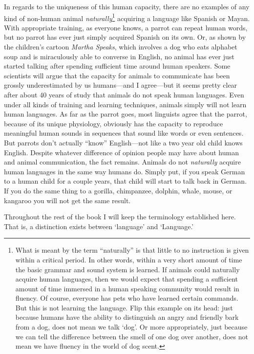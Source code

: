 \documentclass[11pt]{book}%
\theoremstyle{plain}
\numberwithin{equation}{section}
\theoremstyle{definition}
\newtheorem{phrase string}{Phrase String}
\begin{document}
In regards to the uniqueness of this human capacity, there are no examples of any kind of non-human animal \textsl{naturally}\footnote{What is meant by the term ``naturally'' is that little to no instruction is given within a critical period. In other words, within a very short amount of time the basic grammar and sound system is learned. If animals could naturally acquire human languages, then we would expect that spending a sufficient amount of time immersed in a human speaking community would result in fluency. Of course, everyone has pets who have learned certain commands. But this is not learning the language. Flip this example on its head: just because humans have the ability to distinguish an angry and friendly bark from a dog, does not mean we talk `dog'. Or more appropriately, just because we can tell the difference between the smell of one dog over another, does not mean we have fluency in the world of dog scent.} acquiring a language like Spanish or Mayan. With appropriate training, as everyone knows, a parrot can repeat human words, but no parrot has ever just simply acquired Spanish on its own. Or, as shown by the children's cartoon \textsl{Martha Speaks}, which involves a dog who eats alphabet soup and is miraculously able to converse in English, no animal has ever just started talking after spending sufficient time around human speakers. Some scientists will argue that the capacity for animals to communicate has been grossly underestimated by us humans---and I agree---but it seems pretty clear after about 40 years of study that animals do not speak human languages. Even under all kinds of training and learning techniques, animals simply will not learn human languages. As far as the parrot goes, most linguists agree that the parrot, because of its unique physiology, obviously has the capacity to reproduce meaningful human sounds in sequences that sound like words or even sentences. But parrots don't actually ``know'' English---not like a two year old child knows English. Despite whatever difference of opinion people may have about human and animal communication, the fact remains. Animals do not \textsl{naturally} acquire human languages in the same way humans do. Simply put, if you speak German to a human child for a couple years, that child will start to talk back in German. If you do the same thing to a gorilla, chimpanzee, dolphin, whale, mouse, or kangaroo you will not get the same result. 

Throughout the rest of the book I will keep the terminology established here. That is, a distinction exists between `language' and `Language.'  
\end{document}
